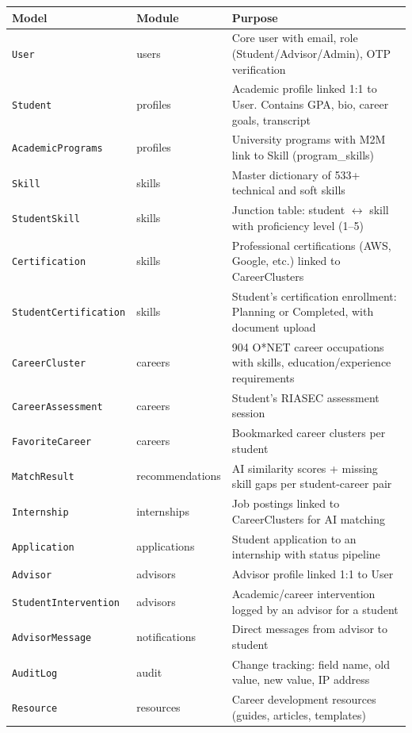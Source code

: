 \documentclass[12pt, a4paper]{article}
\begin{document}
\begin{longtable}{p{4cm}p{3cm}p{7cm}}
\toprule
\textbf{Model} & \textbf{Module} & \textbf{Purpose} \\
\midrule
\endhead
\texttt{User} & users & Core user with email, role (Student/Advisor/Admin), OTP verification \\
\texttt{Student} & profiles & Academic profile linked 1:1 to User. Contains GPA, bio, career goals, transcript \\
\texttt{AcademicPrograms} & profiles & University programs with M2M link to Skill (program\_skills) \\
\texttt{Skill} & skills & Master dictionary of 533+ technical and soft skills \\
\texttt{StudentSkill} & skills & Junction table: student $\leftrightarrow$ skill with proficiency level (1--5) \\
\texttt{Certification} & skills & Professional certifications (AWS, Google, etc.) linked to CareerClusters \\
\texttt{StudentCertification} & skills & Student's certification enrollment: Planning or Completed, with document upload \\
\texttt{CareerCluster} & careers & 904 O*NET career occupations with skills, education/experience requirements \\
\texttt{CareerAssessment} & careers & Student's RIASEC assessment session \\
\texttt{FavoriteCareer} & careers & Bookmarked career clusters per student \\
\texttt{MatchResult} & recommendations & AI similarity scores + missing skill gaps per student-career pair \\
\texttt{Internship} & internships & Job postings linked to CareerClusters for AI matching \\
\texttt{Application} & applications & Student application to an internship with status pipeline \\
\texttt{Advisor} & advisors & Advisor profile linked 1:1 to User \\
\texttt{StudentIntervention} & advisors & Academic/career intervention logged by an advisor for a student \\
\texttt{AdvisorMessage} & notifications & Direct messages from advisor to student \\
\texttt{AuditLog} & audit & Change tracking: field name, old value, new value, IP address \\
\texttt{Resource} & resources & Career development resources (guides, articles, templates) \\
\bottomrule
\end{longtable}
\end{document}
